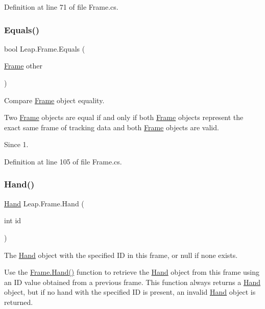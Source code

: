 Definition at line 71 of file Frame.\+cs.

\mbox{\label{class_leap_1_1_frame_a187abb599b41235c216bb8c8729bbc46}} 
\subsubsection{\texorpdfstring{Equals()}{Equals()}}
{\footnotesize\ttfamily bool Leap.\+Frame.\+Equals (\begin{DoxyParamCaption}\item[{\mbox{\hyperlink{class_leap_1_1_frame}{Frame}}}]{other }\end{DoxyParamCaption})}



Compare \mbox{\hyperlink{class_leap_1_1_frame}{Frame}} object equality. 

Two \mbox{\hyperlink{class_leap_1_1_frame}{Frame}} objects are equal if and only if both \mbox{\hyperlink{class_leap_1_1_frame}{Frame}} objects represent the exact same frame of tracking data and both \mbox{\hyperlink{class_leap_1_1_frame}{Frame}} objects are valid. \begin{DoxySince}{Since}
1. 
\end{DoxySince}


Definition at line 105 of file Frame.\+cs.

\mbox{\label{class_leap_1_1_frame_a80b74f329128a4c2630d15bf34d9c234}} 
\subsubsection{\texorpdfstring{Hand()}{Hand()}}
{\footnotesize\ttfamily \mbox{\hyperlink{class_leap_1_1_hand}{Hand}} Leap.\+Frame.\+Hand (\begin{DoxyParamCaption}\item[{int}]{id }\end{DoxyParamCaption})}



The \mbox{\hyperlink{class_leap_1_1_hand}{Hand}} object with the specified ID in this frame, or null if none exists. 

Use the \mbox{\hyperlink{class_leap_1_1_frame_a80b74f329128a4c2630d15bf34d9c234}{Frame.\+Hand()}} function to retrieve the \mbox{\hyperlink{class_leap_1_1_hand}{Hand}} object from this frame using an ID value obtained from a previous frame. This function always returns a \mbox{\hyperlink{class_leap_1_1_hand}{Hand}} object, but if no hand with the specified ID is present, an invalid \mbox{\hyperlink{class_leap_1_1_hand}{Hand}} object is returned.

